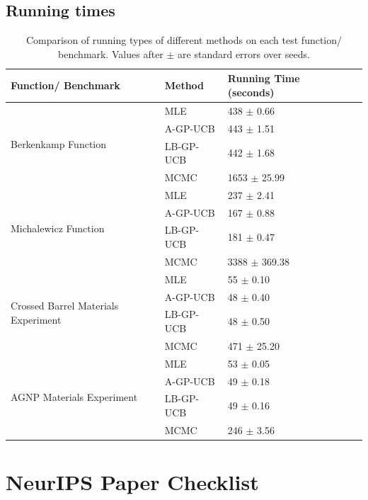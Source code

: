 \documentclass{article}
\theoremstyle{plain}
\theoremstyle{definition}
\theoremstyle{remark}
\theoremstyle{plain}
\begin{document}
\subsection{Running times} \label{app:running_time}
\begin{table}[htbp]
\centering
\caption{Comparison of running types of different methods on each test function/ benchmark. Values after $\pm$ are standard errors over seeds.}
\label{tab:times}
\begin{tabular}{|l|l|l|l|l|}
\hline
\textbf{Function/ Benchmark} & \textbf{Method}    & \textbf{Running Time (seconds)} \\ \hline
\multirow{4}{*}{Berkenkamp Function} 
 & MLE        & 438 $\pm$ 0.66    \\ 
 & A-GP-UCB   & 443 $\pm$ 1.51    \\ 
 & LB-GP-UCB  & 442 $\pm$ 1.68    \\ 
 & MCMC       & 1653 $\pm$ 25.99  \\ \hline

\multirow{4}{*}{Michalewicz Function} 
 & MLE        & 237 $\pm$ 2.41    \\ 
 & A-GP-UCB   & 167 $\pm$ 0.88    \\ 
 & LB-GP-UCB  & 181 $\pm$ 0.47    \\ 
 & MCMC       & 3388 $\pm$ 369.38 \\ \hline

\multirow{4}{*}{Crossed Barrel Materials Experiment} 
 & MLE        & 55 $\pm$ 0.10     \\ 
 & A-GP-UCB   & 48 $\pm$ 0.40     \\ 
 & LB-GP-UCB  & 48 $\pm$ 0.50     \\ 
 & MCMC       & 471 $\pm$ 25.20   \\ \hline

\multirow{4}{*}{AGNP Materials Experiment} 
 & MLE        & 53 $\pm$ 0.05     \\ 
 & A-GP-UCB   & 49 $\pm$ 0.18     \\ 
 & LB-GP-UCB  & 49 $\pm$ 0.16     \\ 
 & MCMC       & 246 $\pm$ 3.56    \\ \hline
\end{tabular}
\end{table}




\newpage
\section*{NeurIPS Paper Checklist}
\end{document}
